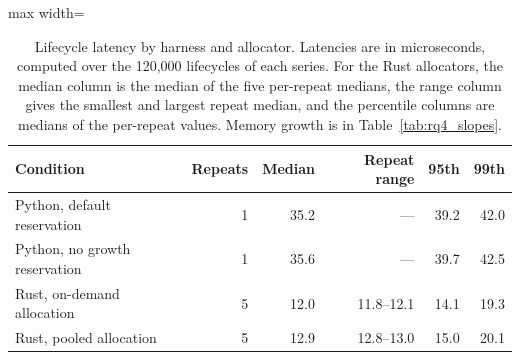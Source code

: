\begin{table}[t]
\caption{Lifecycle latency by harness and allocator. Latencies are in microseconds, computed over the 120,000 lifecycles of each series. For the Rust allocators, the median column is the median of the five per-repeat medians, the range column gives the smallest and largest repeat median, and the percentile columns are medians of the per-repeat values. Memory growth is in Table~\ref{tab:rq4_slopes}.}\label{tab:rq4_latency}
\footnotesize
\setlength{\tabcolsep}{4pt}%
\begin{adjustbox}{max width=\textwidth}%
\begin{tabular}{lrrrrr}
\toprule
Condition & Repeats & Median & Repeat range & 95th & 99th \\
\midrule
Python, default reservation & 1 & 35.2 & --- & 39.2 & 42.0 \\
Python, no growth reservation & 1 & 35.6 & --- & 39.7 & 42.5 \\
Rust, on-demand allocation & 5 & 12.0 & 11.8--12.1 & 14.1 & 19.3 \\
Rust, pooled allocation & 5 & 12.9 & 12.8--13.0 & 15.0 & 20.1 \\
\bottomrule
\end{tabular}%
\end{adjustbox}
\end{table}
